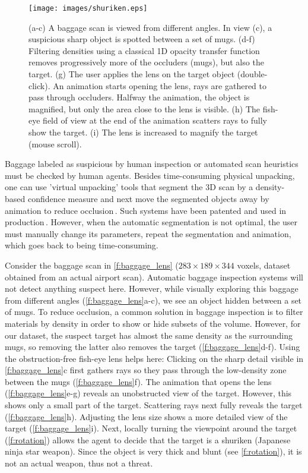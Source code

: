 \begin{figure}
\centering
\texttt{[image: images/shuriken.eps]}

\caption{(a-c) A baggage scan is viewed from different angles. In view (c), a suspicious sharp object is spotted between a set of mugs. (d-f) Filtering densities using a classical 1D opacity transfer function removes progressively more of the occluders (mugs), but also the target. (g) The user applies the lens on the target object (double-click). An animation starts opening the lens, rays are gathered to pass through occluders. Halfway the animation, the object is magnified, but only the area close to the lens is visible. (h) The fish-eye field of view at the end of the animation scatters rays to fully show the target. (i) The lens is increased to magnify the target (mouse scroll).}
\label{f:baggage_lens}
\end{figure}


Baggage labeled as suspicious by human inspection or automated scan heuristics must be checked by human agents. Besides time-consuming physical unpacking, one can use 'virtual unpacking' tools that segment the 3D scan by a density-based confidence measure and next move the segmented objects away by animation to reduce occlusion\,\cite{Li:2012:LVV:2425296.2425325}. Such systems have been patented and used in production\,\cite{patent}. However, when the automatic segmentation is not optimal, the user must manually change its parameters, repeat the segmentation and animation, which goes back to being time-consuming.

Consider the baggage scan in \autoref{f:baggage_lens} ($283 \times 189 \times 344$ voxels, dataset obtained from an actual airport scan). Automatic baggage inspection systems will not detect anything suspect here. However, while visually exploring this baggage from different angles (\autoref{f:baggage_lens}a-c), we see an object hidden between a set of mugs. To reduce occlusion, a common solution in baggage inspection is to filter materials by density in order to show or hide subsets of the volume. However, for our dataset, the suspect target has almost the same density as the surrounding mugs, so removing the latter also removes the target (\autoref{f:baggage_lens}d-f). Using the obstruction-free fish-eye lens helps here: Clicking on the sharp detail visible in \autoref{f:baggage_lens}c first gathers rays so they pass through the low-density zone between the mugs (\autoref{f:baggage_lens}f). The animation that opens the lens 
(\autoref{f:baggage_lens}e-g) reveals an unobstructed view of the target. However, this shows only a small part of the target. Scattering rays next fully reveals the target (\autoref{f:baggage_lens}h). Adjusting the lens size shows a more detailed view of the target (\autoref{f:baggage_lens}i). Next, locally turning the viewpoint around the target (\autoref{f:rotation}) allows the agent to decide that the target is a shuriken (Japanese ninja star weapon). Since the object is very thick and blunt (see \autoref{f:rotation}), it is not an actual weapon, thus not a threat.

